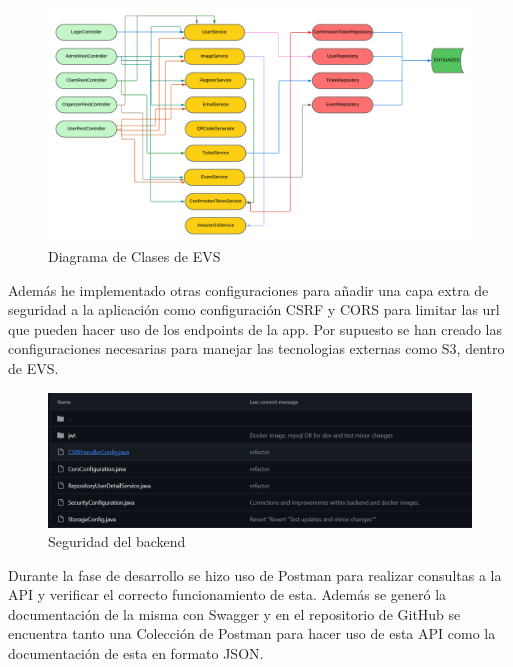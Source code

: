 \begin{figure}[h]
    \centering
    \includegraphics[width=1\textwidth]{DiagramaClases.png} 
    \caption{Diagrama de Clases de EVS}
    \label{fig:class_architecture}
\end{figure}

Además he implementado otras configuraciones para añadir una capa extra de seguridad a la aplicación como configuración CSRF y CORS para limitar las url 
que pueden hacer uso de los endpoints de la app. Por supuesto se han creado las configuraciones necesarias para manejar las tecnologias externas como S3, dentro de 
EVS.
\newpage
\begin{figure}[h]
    \centering
    \includegraphics[width=1\textwidth]{security.png} 
    \caption{Seguridad del backend}
    \label{fig:securityClasses}
\end{figure}

Durante la fase de desarrollo se hizo uso de Postman para realizar consultas a la API y verificar el correcto funcionamiento de esta. Además se generó la documentación de la
misma con Swagger y en el repositorio de GitHub se encuentra tanto una Colección de Postman para hacer uso de esta API como la documentación de esta en formato JSON.

